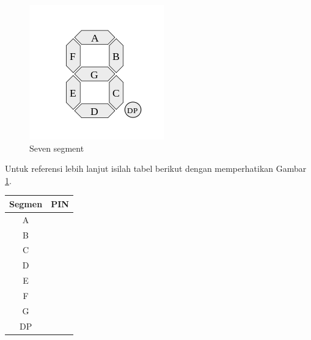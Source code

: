 \begin{figure}[H]
\centering
\includegraphics[scale=0.5]{images/sseg.png}
\par
\caption{Seven segment}\label{fig:sseg}
\end{figure}

Untuk referensi lebih lanjut isilah tabel berikut dengan memperhatikan Gambar
\ref{fig:sseg}.

\begin{table}[H]
\centering
\begin{tabular}{|c|c|}
\hline
Segmen & PIN \\
\hline
A & \\
\hline
B & \\
\hline
C & \\
\hline
D & \\
\hline
E & \\
\hline
F & \\
\hline
G & \\
\hline
DP & \\
\hline
\end{tabular}
\end{table}

